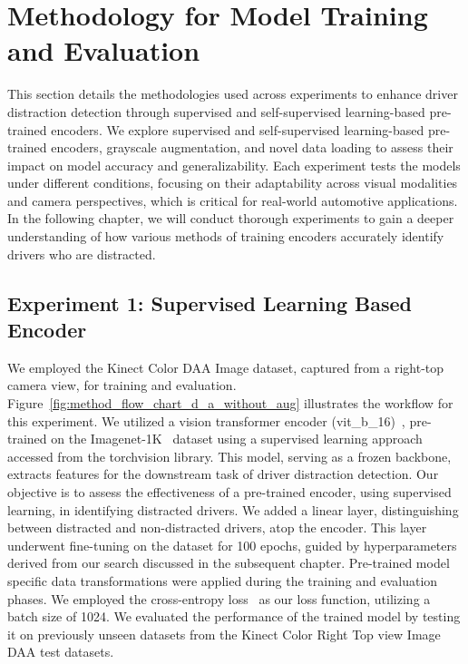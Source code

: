 \section{Methodology for Model Training and Evaluation}
\label{section:Methodology for Model Training and Evaluation}
This section details the methodologies used across experiments to enhance driver distraction detection through supervised and self-supervised learning-based pre-trained encoders. We explore supervised and self-supervised learning-based pre-trained encoders, grayscale augmentation, and novel data loading to assess their impact on model accuracy and generalizability. Each experiment tests the models under different conditions, focusing on their adaptability across visual modalities and camera perspectives, which is critical for real-world automotive applications. In the following chapter, we will conduct thorough experiments to gain a deeper understanding of how various methods of training encoders accurately identify drivers who are distracted.

\subsection{Experiment 1: Supervised Learning Based Encoder}
\label{section:Methodology Experiment 1: Supervised Learning Based Encoder}
We employed the Kinect Color DAA Image dataset, captured from a right-top camera view, for training and evaluation. Figure~\ref{fig:method_flow_chart_d_a_without_aug} illustrates the workflow for this experiment. We utilized a vision transformer encoder (vit\_b\_16)~\citep{vit_b_16_pytorch}, pre-trained on the Imagenet-1K~\citep{Imagenet1k_ILSVRC15} dataset using a supervised learning approach accessed from the torchvision library. This model, serving as a frozen backbone, extracts features for the downstream task of driver distraction detection. Our objective is to assess the effectiveness of a pre-trained encoder, using supervised learning, in identifying distracted drivers. We added a linear layer, distinguishing between distracted and non-distracted drivers, atop the encoder. This layer underwent fine-tuning on the dataset for 100 epochs, guided by hyperparameters derived from our search discussed in the subsequent chapter. Pre-trained model specific data transformations were applied during the training and evaluation phases. We employed the cross-entropy loss~\citep{cross_entropy_loss_mao2023cross} as our loss function, utilizing a batch size of 1024. We evaluated the performance of the trained model by testing it on previously unseen datasets from the Kinect Color Right Top view Image DAA test datasets.

